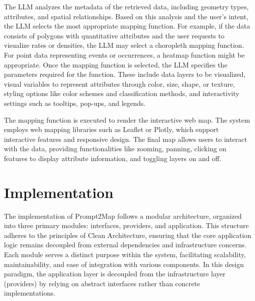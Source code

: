 The LLM analyzes the metadata of the retrieved data, including geometry types, attributes, and spatial relationships. Based on this analysis and the user's intent, the LLM selects the most appropriate mapping function. For example, if the data consists of polygons with quantitative attributes and the user requests to visualize rates or densities, the LLM may select a choropleth mapping function. For point data representing events or occurrences, a heatmap function might be appropriate. Once the mapping function is selected, the LLM specifies the parameters required for the function. These include data layers to be visualized, visual variables to represent attributes through color, size, shape, or texture, styling options like color schemes and classification methods, and interactivity settings such as tooltips, pop-ups, and legends.

The mapping function is executed to render the interactive web map. The system employs web mapping libraries such as Leaflet or Plotly, which support interactive features and responsive design. The final map allows users to interact with the data, providing functionalities like zooming, panning, clicking on features to display attribute information, and toggling layers on and off.

\section{Implementation}



The implementation of Prompt2Map follows a modular architecture, organized into three primary modules: interfaces, providers, and application. This structure adheres to the principles of Clean Architecture, ensuring that the core application logic remains decoupled from external dependencies and infrastructure concerns. Each module serves a distinct purpose within the system, facilitating scalability, maintainability, and ease of integration with various components. In this design paradigm, the application layer is decoupled from the infrastructure layer (providers) by relying on abstract interfaces rather than concrete implementations. 

